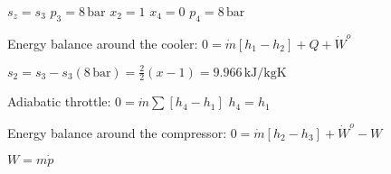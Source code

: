 \( s_z = s_3 \)  
\( p_3 = 8 \, \text{bar} \)  
\( x_2 = 1 \)  
\( x_4 = 0 \)  
\( p_4 = 8 \, \text{bar} \)  

Energy balance around the cooler:  
\( 0 = \dot{m} [h_1 - h_2] + Q + \dot{W}^o \)  

\( s_2 = s_3 - s_3(8 \, \text{bar}) = \frac{2}{2}(x - 1) = 9.966 \, \text{kJ/kgK} \)  

Adiabatic throttle:  
\( 0 = \dot{m} \sum [h_4 - h_1] \)  
\( h_4 = h_1 \)  

Energy balance around the compressor:  
\( 0 = \dot{m} [h_2 - h_3] + \dot{W}^o - W \)  

\( W = m \dot{p} \)